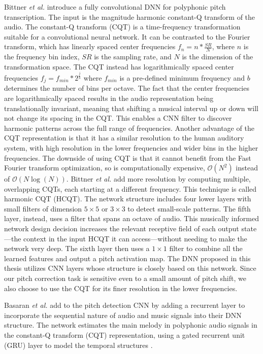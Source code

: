 Bittner \textit{et al.} introduce a fully convolutional DNN for polyphonic pitch transcription. The input is the magnitude harmonic constant-Q transform of the audio. The constant-Q transform (CQT) is a time-frequency transformation suitable for a convolutional neural network. It can be contrasted to the Fourier transform, which has linearly spaced center frequencies $f_n = n * \frac{SR}{N}$, where $n$ is the frequency bin index, $SR$ is the sampling rate, and $N$ is the dimension of the transformation space. The CQT instead has logarithmically spaced center frequencies $f_j = f_{min} * 2^{\frac{j}{b}}$ where $f_{min}$ is a pre-defined minimum frequency and $b$ determines the number of bins per octave. The fact that the center frequencies are logarithmically spaced results in the audio representation being translationally invariant, meaning that shifting a musical interval up or down will not change its spacing in the CQT. This enables a CNN filter to discover harmonic patterns across the full range of frequencies. Another advantage of the CQT representation is that it has a similar resolution to the human auditory system, with high resolution in the lower frequencies and wider bins in the higher frequencies. The downside of using CQT is that it cannot benefit from the Fast Fourier transform optimization, so is computationally expensive, $\mathcal{O}(N^2)$ instead of $\mathcal{O}(N \log (N))$. Bittner \textit{et al.} add more resolution by computing multiple, overlapping CQTs, each starting at a different frequency. This technique is called harmonic CQT (HCQT). The network structure includes four lower layers with small filters of dimension $5 \times 5$ or $3 \times 3$ to detect small-scale patterns. The fifth layer, instead, uses a filter that spans an octave of audio. This musically informed network design decision increases the relevant receptive field of each output state---the context in the input HCQT it can access---without needing to make the network very deep. The sixth layer then uses a $1 \times 1$ filter to combine all the learned features and output a pitch activation map. \cite{bittner2017deep} The DNN proposed in this thesis utilizes CNN layers whose structure is closely based on this network. Since our pitch correction task is sensitive even to a small amount of pitch shift, we also choose to use the CQT for its finer resolution in the lower frequencies. 

Basaran {\it et al.} add to the pitch detection CNN by adding a recurrent layer to incorporate the sequential nature of audio and music signals into their DNN structure. The network estimates the main melody in polyphonic audio signals in the constant-Q transform (CQT) representation, using a gated recurrent unit (GRU) layer \cite{chung2014empirical, ChoK2014arxiv} to model the temporal structures \cite{basaranmain}. 

